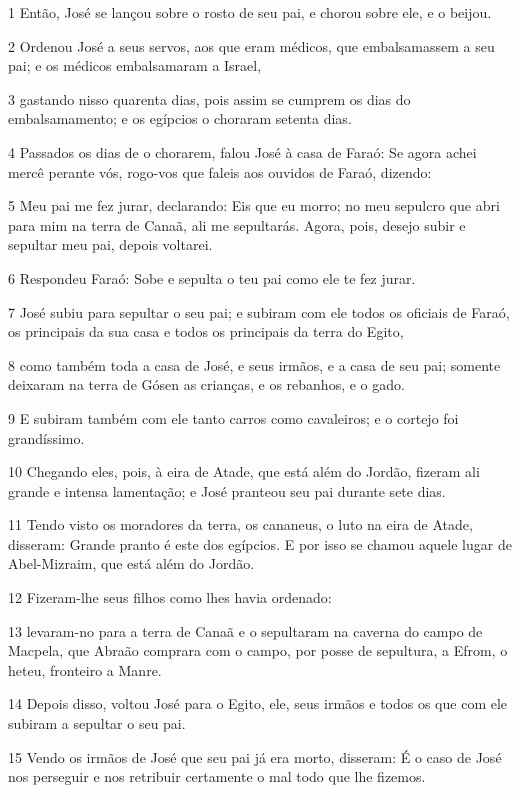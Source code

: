 \par 1 Então, José se lançou sobre o rosto de seu pai, e chorou sobre ele, e o beijou.
\par 2 Ordenou José a seus servos, aos que eram médicos, que embalsamassem a seu pai; e os médicos embalsamaram a Israel,
\par 3 gastando nisso quarenta dias, pois assim se cumprem os dias do embalsamamento; e os egípcios o choraram setenta dias.
\par 4 Passados os dias de o chorarem, falou José à casa de Faraó: Se agora achei mercê perante vós, rogo-vos que faleis aos ouvidos de Faraó, dizendo:
\par 5 Meu pai me fez jurar, declarando: Eis que eu morro; no meu sepulcro que abri para mim na terra de Canaã, ali me sepultarás. Agora, pois, desejo subir e sepultar meu pai, depois voltarei.
\par 6 Respondeu Faraó: Sobe e sepulta o teu pai como ele te fez jurar.
\par 7 José subiu para sepultar o seu pai; e subiram com ele todos os oficiais de Faraó, os principais da sua casa e todos os principais da terra do Egito,
\par 8 como também toda a casa de José, e seus irmãos, e a casa de seu pai; somente deixaram na terra de Gósen as crianças, e os rebanhos, e o gado.
\par 9 E subiram também com ele tanto carros como cavaleiros; e o cortejo foi grandíssimo.
\par 10 Chegando eles, pois, à eira de Atade, que está além do Jordão, fizeram ali grande e intensa lamentação; e José pranteou seu pai durante sete dias.
\par 11 Tendo visto os moradores da terra, os cananeus, o luto na eira de Atade, disseram: Grande pranto é este dos egípcios. E por isso se chamou aquele lugar de Abel-Mizraim, que está além do Jordão.
\par 12 Fizeram-lhe seus filhos como lhes havia ordenado:
\par 13 levaram-no para a terra de Canaã e o sepultaram na caverna do campo de Macpela, que Abraão comprara com o campo, por posse de sepultura, a Efrom, o heteu, fronteiro a Manre.
\par 14 Depois disso, voltou José para o Egito, ele, seus irmãos e todos os que com ele subiram a sepultar o seu pai.
\par 15 Vendo os irmãos de José que seu pai já era morto, disseram: É o caso de José nos perseguir e nos retribuir certamente o mal todo que lhe fizemos.
